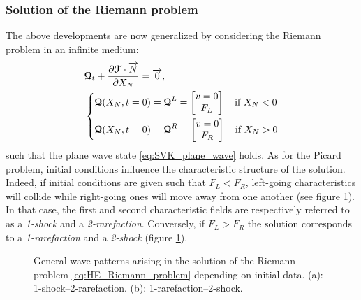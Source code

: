 \subsubsection*{Solution of the Riemann problem}
The above developments are now generalized by considering the Riemann problem in an infinite medium:
\begin{equation}
  \label{eq:HE_Riemann_problem}
  \begin{aligned}
    &{\boldsymbol{\mathcal{Q}}}_t + \frac{\partial {\boldsymbol{\mathcal{F}}}\cdot {\overrightarrow{N}}}{\partial X_N} = {\overrightarrow{0}}, \\
    &\left\lbrace 
      \begin{aligned}
        & {\boldsymbol{\mathcal{Q}}}(X_N,t=0) = {\boldsymbol{\mathcal{Q}}}^L = \left[\begin{matrix}v=0 \\ F_L\end{matrix}\right] \quad \text{if } X_N< 0\\
        & {\boldsymbol{\mathcal{Q}}}(X_N,t=0) = {\boldsymbol{\mathcal{Q}}}^R = \left[\begin{matrix}v=0 \\ F_R\end{matrix}\right]\quad \text{if } X_N> 0
      \end{aligned}
    \right.
  \end{aligned}
\end{equation}
such that the plane wave state \eqref{eq:SVK_plane_wave} holds.
As for the Picard problem, initial conditions influence the characteristic structure of the solution. Indeed, if initial conditions are given such that $F_L<F_R$, left-going characteristics will collide while right-going ones will move away from one another (see figure \ref{fig:RP_solution}). In that case, the first and second characteristic fields are respectively referred to as a \textit{1-shock} and a \textit{2-rarefaction}. Conversely, if $F_L>F_R$ the solution corresponds to a \textit{1-rarefaction} and a \textit{2-shock} (figure \ref{fig:RP_solution}). 

\begin{figure}[h]
  \centering
  \caption{General wave patterns arising in the solution of the Riemann problem \eqref{eq:HE_Riemann_problem} depending on initial data. (a): 1-shock--2-rarefaction. (b): 1-rarefaction--2-shock.}
  \label{fig:RP_solution}
\end{figure}

